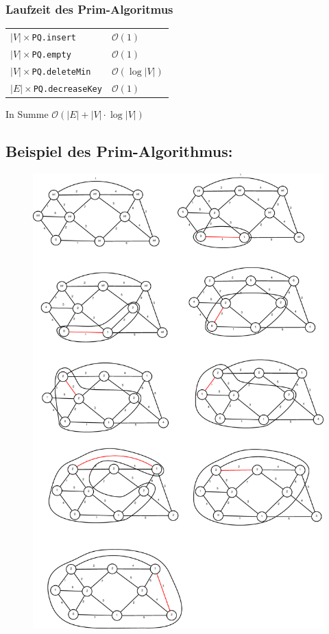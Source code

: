 \subsubsection{Laufzeit des Prim-Algoritmus}
\begin{tabular}{ll}
	$|V|\times$\texttt{PQ.insert}&$\mathcal{O}(1)$\\
	$|V|\times$\texttt{PQ.empty}&$\mathcal{O}(1)$\\
	$|V|\times$\texttt{PQ.deleteMin}&$\mathcal{O}(\log|V|)$\\
	$|E|\times$\texttt{PQ.decreaseKey}&$\mathcal{O}(1)$
\end{tabular}
In Summe $\mathcal{O}(|E|+|V|\cdot\log|V|)$

\newpage
\subsection{Beispiel des Prim-Algorithmus:}
\begin{figure}[h]
	\centering
	\includegraphics[width=0.65\linewidth]{20/Grafik/BspPrim}
	\caption*{}
\end{figure}

